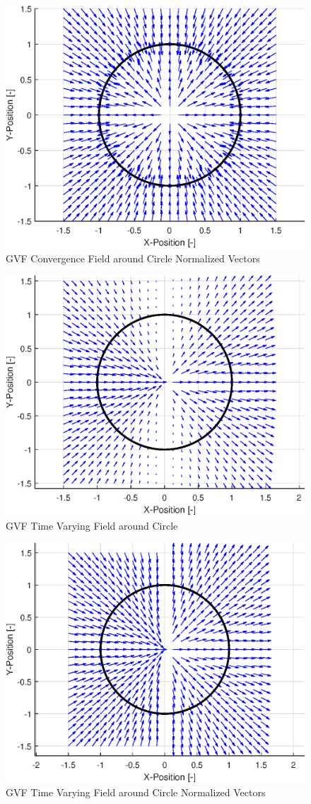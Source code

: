 \documentclass[conf]{new-aiaa}
\begin{document}
\begin{figure}[H]
	\centering
	\includegraphics[width=0.7\linewidth]{Convnorm}
	\caption{GVF Convergence Field around Circle Normalized Vectors}
	\label{fig:Convn}
\end{figure}
\begin{figure}[H]
	\centering
	\includegraphics[width=0.7\linewidth]{TV}
	\caption{GVF Time Varying Field around Circle}
	\label{fig:TV}
\end{figure}
\begin{figure}[H]
	\centering
	\includegraphics[width=0.7\linewidth]{TVnorm}
	\caption{GVF Time Varying Field around Circle Normalized Vectors}
	\label{fig:TVn}
\end{figure}
\end{document}
